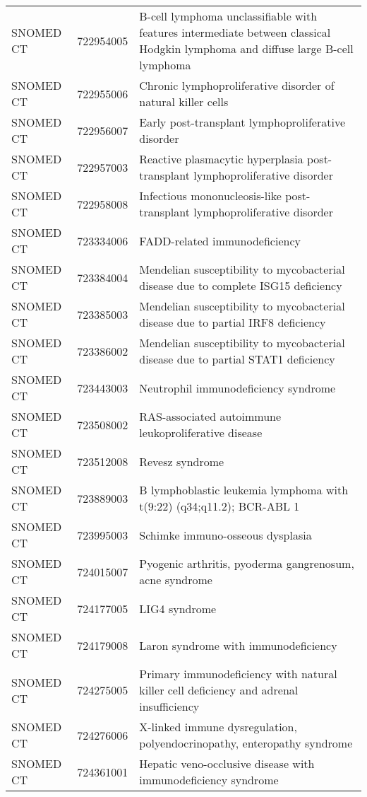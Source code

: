 \begin{table}[ht]
\begin{tabular}{lll}
  SNOMED CT & 722954005 & B-cell lymphoma unclassifiable with features intermediate between classical Hodgkin lymphoma and diffuse large B-cell lymphoma \\ 
  SNOMED CT & 722955006 & Chronic lymphoproliferative disorder of natural killer cells \\ 
  SNOMED CT & 722956007 & Early post-transplant lymphoproliferative disorder \\ 
  SNOMED CT & 722957003 & Reactive plasmacytic hyperplasia post-transplant lymphoproliferative disorder \\ 
  SNOMED CT & 722958008 & Infectious mononucleosis-like post-transplant lymphoproliferative disorder \\ 
  SNOMED CT & 723334006 & FADD-related immunodeficiency \\ 
  SNOMED CT & 723384004 & Mendelian susceptibility to mycobacterial disease due to complete ISG15 deficiency \\ 
  SNOMED CT & 723385003 & Mendelian susceptibility to mycobacterial disease due to partial IRF8 deficiency \\ 
  SNOMED CT & 723386002 & Mendelian susceptibility to mycobacterial disease due to partial STAT1 deficiency \\ 
  SNOMED CT & 723443003 & Neutrophil immunodeficiency syndrome \\ 
  SNOMED CT & 723508002 & RAS-associated autoimmune leukoproliferative disease \\ 
  SNOMED CT & 723512008 & Revesz syndrome \\ 
  SNOMED CT & 723889003 & B lymphoblastic leukemia lymphoma with t(9:22) (q34;q11.2); BCR-ABL 1 \\ 
  SNOMED CT & 723995003 & Schimke immuno-osseous dysplasia \\ 
  SNOMED CT & 724015007 & Pyogenic arthritis, pyoderma gangrenosum, acne syndrome \\ 
  SNOMED CT & 724177005 & LIG4 syndrome \\ 
  SNOMED CT & 724179008 & Laron syndrome with immunodeficiency \\ 
  SNOMED CT & 724275005 & Primary immunodeficiency with natural killer cell deficiency and adrenal insufficiency \\ 
  SNOMED CT & 724276006 & X-linked immune dysregulation, polyendocrinopathy, enteropathy syndrome \\ 
  SNOMED CT & 724361001 & Hepatic veno-occlusive disease with immunodeficiency syndrome \\ 

\end{tabular}
\end{table}
